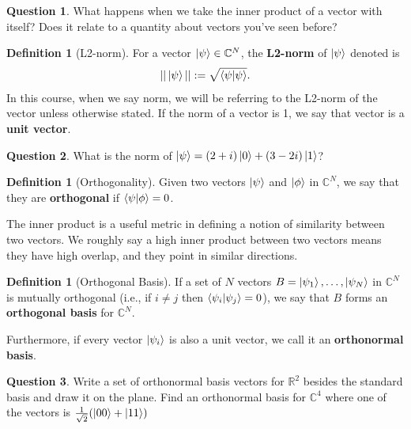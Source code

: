\documentclass[letterpaper, 12pt]{article}
\newcommand{\R}{\mathbb{R}}	%
\newcommand{\C}{\mathbb{C}}	%
\newcommand{\1}{\mathds{1}}	%
\theoremstyle{definition}
\newtheorem{definition}[theorem]{Definition}
\newtheorem{question}{Question}
\begin{document}
\begin{question}
    What happens when we take the inner product of a vector with itself? Does it relate to a quantity about vectors you've seen before? 
\end{question}
\vspace{45mm}

\begin{definition}[L2-norm]
    For a vector $\ket{\psi} \in \C^N$, the \textbf{L2-norm} of $\ket{\psi}$ denoted is 
    \begin{equation}
        ||\ket{\psi} || := \sqrt{\braket{\psi|\psi}}.
    \end{equation}
    In this course, when we say norm, we will be referring to the L2-norm of the vector unless otherwise stated. If the norm of a vector is 1, we say that vector is a \textbf{unit vector}. 
\end{definition}

\begin{question}
    What is the norm of $\ket{\psi} = (2+i)\ket{0} + (3 - 2i)\ket{1}$?
\end{question}
\vspace{60mm}

\begin{definition}[Orthogonality]
    Given two vectors $\ket{\psi}$ and $\ket{\phi}$ in $\C^N$, we say that they are \textbf{orthogonal} if $\braket{\psi|\phi} = 0$.
\end{definition}

The inner product is a useful metric in defining a notion of similarity between two vectors. We roughly say a high inner product between two vectors means they have high overlap, and they point in similar directions. 
\vspace{40mm}

\begin{definition}[Orthogonal Basis]
    If a set of $N$ vectors $B = \ket{\psi_1},\ldots,\ket{\psi_N}$ in $\C^N$ is mutually orthogonal (i.e., if $i \neq j$ then $\braket{\psi_i|\psi_j} = 0$), we say that $B$ forms an \textbf{orthogonal basis} for $\C^N$.

    Furthermore, if every vector $\ket{\psi_i}$ is also a unit vector, we call it an \textbf{orthonormal basis}.
\end{definition}

\newpage 

\begin{question}
    Write a set of orthonormal basis vectors for $\R^2$ besides the standard basis and draw it on the plane. Find an orthonormal basis for $\C^4$ where one of the vectors is $\frac{1}{\sqrt{2}}(\ket{00} + \ket{11})$
\end{question}
\vspace{100mm}
\end{document}
